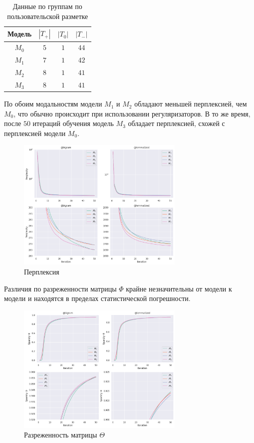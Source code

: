 \documentclass{article}
\begin{document}
\begin{table}[]
    \centering
    \begin{tabular}{c|c|c|c|}
        Модель & $|T_+|$ & $|T_0|$ & $|T_-|$ \\
        \hline
        $M_0$ & $5$ & $1$ & $44$ \\
        $M_1$ & $7$ & $1$ & $42$ \\
        $M_2$ & $8$ & $1$ & $41$ \\
        $M_3$ & $8$ & $1$ & $41$
    \end{tabular}
    \caption{Данные по группам по пользовательской разметке}
    \label{tab:my_label}
\end{table}

По обоим модальностям модели $M_1$ и $M_2$ обладают меньшей перплексией, чем $M_0$, что обычно происходит при использовании регуляризаторов. \citep{artm2}
В то же время, после $50$ итераций обучения модель $M_3$ обладает перплексией, схожей с перплексией модели $M_0$.

\begin{figure}[h]
\includegraphics[width=8cm]{figures/perplexity_v3.png}
\centering
\caption{Перплексия}
\end{figure}

Различия по разреженности матрицы $\Phi$ крайне незначительны от модели к модели и находятся в пределах статистической погрешности.

\begin{figure}[h]
\includegraphics[width=8cm]{figures/sparsity_v3.png}
\centering
\caption{Разреженность матрицы $\Theta$}
\end{figure}
\end{document}
